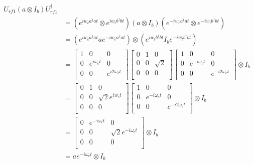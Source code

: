 \documentclass[letterpaper, 12pt]{article}
\begin{document}
\begin{align*}
  U_{rf1}(a \otimes I_{b})U_{rf1}^{\dagger}\\
  &= (e^{iw_{c}a^{\dagger}at} \otimes e^{iw_{t}b^{\dagger}bt})(a \otimes I_{b})(e^{-iw_{c}a^{\dagger}at} \otimes e^{-iw_{t}b^{\dagger}bt}) \\
  &= (e^{iw_{c}a^{\dagger}at}ae^{-iw_{c}a^{\dagger}at}) \otimes (e^{iw_{t}b^{\dagger}bt}I_{b}e^{-iw_{t}b^{\dagger}bt})\\
  &=\left[{\begin{array}{ccc}
        1 & 0           & 0 \\
        0 & e^{i\omega_{c}t} & 0 \\
        0 & 0           & e^{i2\omega_{c}t}\\
    \end{array}} \right]
  \left[{\begin{array}{ccc}
      0 & 1 & 0 \\
      0 & 0 & \sqrt{2} \\
      0 & 0 & 0 \\
      \end{array}}\right]
  \left[{\begin{array}{ccc}
        1 & 0            & 0 \\
        0 & e^{-i\omega_{c}t} & 0\\
        0 & 0            & e^{-i2\omega_{c}t}\\
    \end{array}}\right]
  \otimes I_{b} \\
  &=\left[{\begin{array}{ccc}
        0 & 1 & 0 \\
        0 & 0 & \sqrt{2}e^{iw_{c}t} \\
        0 & 0 & 0\\
    \end{array}} \right]
  \left[{\begin{array}{ccc}
        1 & 0           & 0 \\
        0 & e^{-i\omega_{c}t} & 0 \\
        0 & 0           & e^{-i2\omega_{c}t}\\
    \end{array}} \right]
  \otimes I_{b}\\
    &=\left[{\begin{array}{ccc}
        0 & e^{-i\omega_{c}t} & 0 \\
        0 & 0            & \sqrt{2}e^{-i\omega_{c}t} \\
        0 & 0            & 0\\
    \end{array}} \right]
  \otimes I_{b}\\
  &= ae^{-i\omega_{c}t} \otimes I_{b}\\
\end{align*}
\end{document}
